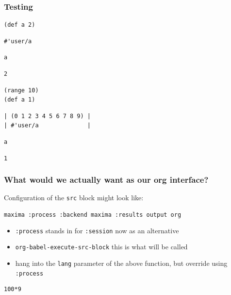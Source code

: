 \documentclass[11pt]{article}
\begin{document}
\subsubsection{Testing}
\label{sec:org81851cb}

\begin{verbatim}
(def a 2)
\end{verbatim}

\begin{verbatim}
#'user/a
\end{verbatim}

\begin{verbatim}
a
\end{verbatim}

\begin{verbatim}
2
\end{verbatim}

\begin{verbatim}
(range 10)
(def a 1)
\end{verbatim}

\begin{verbatim}
| (0 1 2 3 4 5 6 7 8 9) |
| #'user/a              |
\end{verbatim}

\begin{verbatim}
a
\end{verbatim}

\begin{verbatim}
1
\end{verbatim}

\subsubsection{What would we actually want as our org interface?}
\label{sec:org7117cdc}

Configuration of the \texttt{src} block might look like:

\texttt{maxima :process :backend maxima :results output org}

\begin{itemize}
\item \texttt{:process} stands in for \texttt{:session} now as an alternative
\item \texttt{org-babel-execute-src-block} this is what will be called
\item hang into the \texttt{lang} parameter of the above function, but override using \texttt{:process}
\end{itemize}

\begin{verbatim}
100*9
\end{verbatim}
\end{document}
